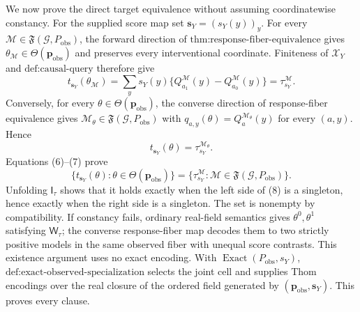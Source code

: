 We now prove the direct target equivalence without assuming coordinatewise constancy. For the supplied score map set \(\mathbf s_Y=(s_Y(y))_y\). For every \(\mathcal M\in\mathfrak F(\mathcal G,P_{\mathrm{obs}})\), the forward direction of \(\text{thm:response-fiber-equivalence}\) gives \(\theta_{\mathcal M}\in\Theta(\mathbf p_{\mathrm{obs}})\) and preserves every interventional coordinate. Finiteness of \(\mathcal X_Y\) and \(\text{def:causal-query}\) therefore give
\[
t_{\mathbf s_Y}(\theta_{\mathcal M})
=\sum_y s_Y(y)\{Q_{a_1}^{\mathcal M}(y)-Q_{a_0}^{\mathcal M}(y)\}
=\tau_{s_Y}^{\mathcal M}.
\tag{6}
\]
Conversely, for every \(\theta\in\Theta(\mathbf p_{\mathrm{obs}})\), the converse direction of response-fiber equivalence gives \(\mathcal M_{\theta}\in\mathfrak F(\mathcal G,P_{\mathrm{obs}})\) with \(q_{a,y}(\theta)=Q_a^{\mathcal M_{\theta}}(y)\) for every \((a,y)\). Hence
\[
t_{\mathbf s_Y}(\theta)=\tau_{s_Y}^{\mathcal M_{\theta}}.
\tag{7}
\]
Equations (6)--(7) prove
\[
\{t_{\mathbf s_Y}(\theta):\theta\in\Theta(\mathbf p_{\mathrm{obs}})\}
=\{\tau_{s_Y}^{\mathcal M}:\mathcal M\in\mathfrak F(\mathcal G,P_{\mathrm{obs}})\}.
\tag{8}
\]
Unfolding \(\mathsf I_{\tau}\) shows that it holds exactly when the left side of (8) is a singleton, hence exactly when the right side is a singleton. The set is nonempty by compatibility. If constancy fails, ordinary real-field semantics gives \(\theta^0,\theta^1\) satisfying \(\mathsf W_{\tau}\); the converse response-fiber map decodes them to two strictly positive models in the same observed fiber with unequal score contrasts. This existence argument uses no exact encoding. With \(\operatorname{Exact}(P_{\mathrm{obs}},s_Y)\), \(\text{def:exact-observed-specialization}\) selects the joint cell and supplies Thom encodings over the real closure of the ordered field generated by \((\mathbf p_{\mathrm{obs}},\mathbf s_Y)\). This proves every clause.